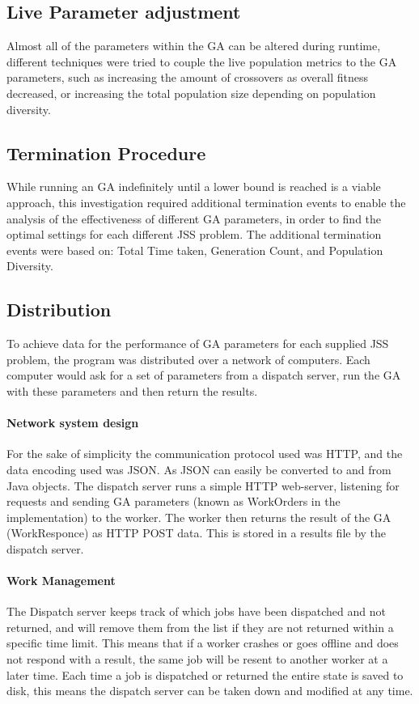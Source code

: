 \documentclass[14pt]{acmsiggraph}
\begin{document}
	\subsection{Live Parameter adjustment}
	Almost all of the parameters within the GA can be altered during runtime, different techniques were tried to couple the live population metrics to the GA parameters, such as increasing the amount of crossovers as overall fitness decreased, or increasing the total population size depending on population diversity.
	
	\subsection{Termination Procedure}
	While running an GA indefinitely until a lower bound is reached is a viable approach, this investigation required additional termination events to enable the analysis of the effectiveness of different GA parameters, in order to find the optimal settings for each different JSS problem. The additional termination events were based on: Total Time taken, Generation Count, and Population Diversity.
	
	\subsection{Distribution}
	To achieve data for the performance of GA parameters for each supplied JSS problem, the program was distributed over a network of computers. Each computer would ask for a set of parameters from a dispatch server, run the GA with these parameters and then return the results.
	
	\paragraph{Network system design}
	For the sake of simplicity the communication protocol used was HTTP, and the data encoding used was JSON. As JSON can easily be converted to and from Java objects. The dispatch server runs a simple HTTP web-server, listening for requests and sending GA parameters (known as WorkOrders in the implementation) to the worker. The worker then returns the result of the GA (WorkResponce) as HTTP POST data. This is stored in a results file by the dispatch server. 
	
	\paragraph{Work Management}
	The Dispatch server keeps track of which jobs have been dispatched and not returned, and will remove them from the list if they are not returned within a specific time limit. This means that if a worker crashes or goes offline and does not respond with a result, the same job will be resent to another worker at a later time. Each time a job is dispatched or returned the entire state is saved to disk, this means the dispatch server can be taken down and modified at any time.
	
\end{document}
